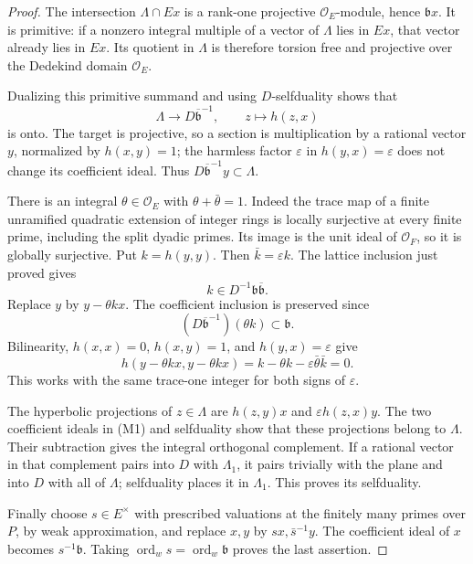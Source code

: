 \begin{proof}
The intersection \(\Lambda\cap Ex\) is a rank-one projective
\(\mathcal O_E\)-module, hence \(\mathfrak b x\).
It is primitive: if a nonzero integral multiple of a vector of
\(\Lambda\) lies in \(Ex\), that vector already lies in \(Ex\).
Its quotient in \(\Lambda\) is therefore torsion free and
projective over the Dedekind domain \(\mathcal O_E\).

Dualizing this primitive summand and using \(D\)-selfduality shows
that
\[
  \Lambda\longrightarrow D\overline{\mathfrak b}^{-1},
                       \qquad z\longmapsto h(z,x)
\]
is onto. The target is projective, so a section is multiplication
by a rational vector \(y\), normalized by \(h(x,y)=1\);
the harmless factor \(\varepsilon\) in \(h(y,x)=\varepsilon\)
does not change its coefficient ideal.
Thus \(D\overline{\mathfrak b}^{-1}y\subset\Lambda\).

There is an integral \(\theta\in\mathcal O_E\) with
\(\theta+\bar\theta=1\). Indeed the trace map of a finite
unramified quadratic extension of integer rings is locally
surjective at every finite prime, including the split dyadic
primes. Its image is the unit ideal of \(\mathcal O_F\),
so it is globally surjective.
Put \(k=h(y,y)\). Then \(\bar k=\varepsilon k\).
The lattice inclusion just proved gives
\[
             k\in D^{-1}\mathfrak b\overline{\mathfrak b}.
\]
Replace \(y\) by \(y-\theta kx\).
The coefficient inclusion is preserved since
\[
 (D\overline{\mathfrak b}^{-1})
    (\theta k)\subset\mathfrak b.
\]
Bilinearity, \(h(x,x)=0\), \(h(x,y)=1\), and
\(h(y,x)=\varepsilon\) give
\[
 h(y-\theta kx,y-\theta kx)
       =k-\theta k-\varepsilon\bar\theta\bar k=0.
\]
This works with the same trace-one integer for both signs
of \(\varepsilon\).

The hyperbolic projections of \(z\in\Lambda\) are
\(h(z,y)x\) and \(\varepsilon h(z,x)y\).
The two coefficient ideals in (M1) and selfduality show that
these projections belong to \(\Lambda\). Their subtraction
gives the integral orthogonal complement. If a rational
vector in that complement pairs into \(D\) with \(\Lambda_1\),
it pairs trivially with the plane and into \(D\) with all of
\(\Lambda\); selfduality places it in \(\Lambda_1\).
This proves its selfduality.

Finally choose \(s\in E^\times\) with prescribed valuations at
the finitely many primes over \(P\), by weak approximation,
and replace \(x,y\) by \(sx,\bar s^{-1}y\).
The coefficient ideal of \(x\) becomes \(s^{-1}\mathfrak b\).
Taking \(\operatorname{ord}_w s=\operatorname{ord}_w\mathfrak b\)
proves the last assertion.
\end{proof}

